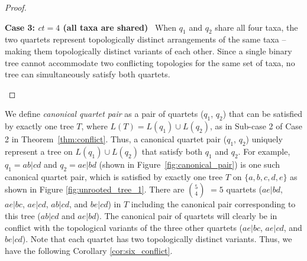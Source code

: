 \documentclass[10pt,a4paper]{article}
\newcommand{\addb}[1]{{\color{red} #1}}
\begin{document}
\begin{proof}
\begin{itemize}
\begin{itemize}
 
\end{itemize}


\textbf{Case 3: $ct = 4$ (all taxa are shared)} \ When $q_1$ and $q_2$ share all four taxa, the two quartets represent topologically distinct arrangements of the same taxa -- making them topologically distinct variants of each other. Since a single binary tree cannot accommodate two conflicting topologies for the same set of taxa, no tree can simultaneously satisfy both quartets.

\end{itemize}

\end{proof}



We define \textit{canonical quartet pair} as a pair of quartets ($q_1$, $q_2$) that can be satisfied by exactly one tree $T$, where $L(T) = L(q_1) \cup L(q_2)$, as in Sub-case 2 of Case 2 in Theorem~\ref{thm:conflict}. Thus, a canonical quartet pair ($q_1$, $q_2$) uniquely represent a tree on $L(q_1) \cup L(q_2)$ that satisfy both $q_1$ and $q_2$. For example, $q_1 = ab|cd$ and $q_2 = ae|bd$ (shown in Figure~\ref{fig:canonical_pair}) is one such canonical quartet pair, which is satisfied by exactly one tree $T$ on $\{a,b,c,d,e\}$ as shown in Figure \ref{fig:unrooted_tree_1}. There are $5 \choose 4$ $=5$ quartets ($ae|bd$, $ae|bc$, $ae|cd$, $ab|cd$, and $be|cd$) in $T$ including the canonical pair corresponding to this tree ($ab|cd$ and $ae|bd$). The canonical pair of quartets will clearly be in conflict with the topological variants of the three other quartets ($ae|bc$, $ae|cd$, and $be|cd$). Note that each quartet has two topologically distinct variants. Thus, we have the following Corollary \ref{cor:six_conflict}.
\end{document}
